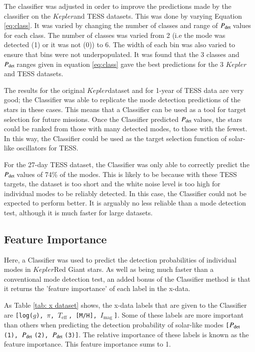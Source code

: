 \documentclass[a4paper,fleqn,usenatbib,useAMS]{mnras}
\newcommand{\teff}{\ensuremath{T_{\textrm{eff}}\:}}
\newcommand{\kep}{\ensuremath{Kepler}\:}
\newcommand{\pdet}{\ensuremath{P_{\rm det}\:}}
\newcommand{\imag}{\ensuremath{I_{\textrm{mag}}\:}}
\begin{document}
The classifier was adjusted in order to improve the predictions made by the classifier on the \kep and TESS datasets. This was done by varying Equation \ref{eq:class}. It was varied by changing the number of classes and range of \pdet values for each class. The number of classes was varied from 2 (i.e the mode was detected (1) or it was not (0)) to 6. The width of each bin was also varied to ensure that bins were not underpopulated. It was found that the 3 classes and \pdet ranges given in equation \ref{eq:class} gave the best predictions for the 3 \kep and TESS datasets. 

The results for the original \kep dataset and for 1-year of TESS data are very good; the Classifier was able to replicate the mode detection predictions of the stars in these cases. This means that a Classifier can be used as a tool for target selection for future missions. Once the Classifier predicted \pdet values, the stars could be ranked from those with many detected modes, to those with the fewest. In this way, the Classifier could be used as the target selection function of solar-like oscillators for TESS. 

For the 27-day TESS dataset, the Classifier was only able to correctly predict the \pdet values of 74\% of the modes. This is likely to be because with these TESS targets, the dataset is too short and the white noise level is too high for individual modes to be reliably detected. In this case, the Classifier could not be expected to perform better. It is arguably no less reliable than a mode detection test, although it is much faster for large datasets. 


\subsection{Feature Importance}
\label{sect: feature importance}

Here, a Classifier was used to predict the detection probabilities of individual modes in \kep Red Giant stars. As well as being much faster than a conventional mode detection test, an added bonus of the Classifier method is that it returns the 'feature importance' of each label in the x-data.

As Table \ref{tab: x dataset} shows, the x-data labels that are given to the Classifier are \texttt{[log($g$), $\pi$, \teff, [M/H], \imag]}. Some of these labels are more important than others when predicting the detection probability of solar-like modes \texttt{[\pdet(1), \pdet(2), \pdet(3)]}. The relative importance of these labels is known as the feature importance. This feature importance sums to 1.
\end{document}
